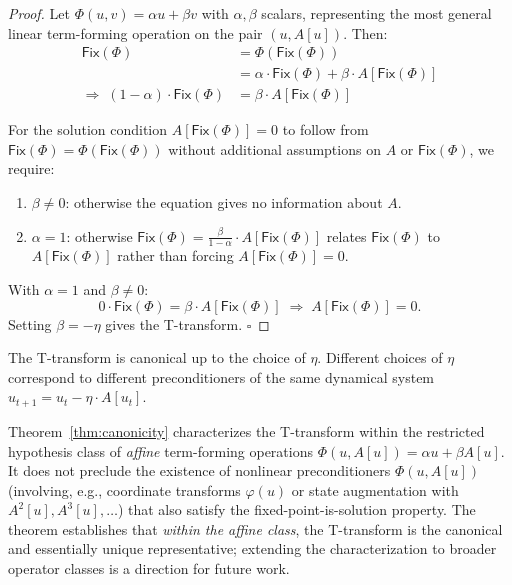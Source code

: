 \documentclass{lmcs}
\theoremstyle{plain}
\theoremstyle{definition}
\newcommand{\fix}{\mathsf{Fix}}
\begin{document}
\begin{proof}
Let $\Phi(u, v) = \alpha u + \beta v$ with $\alpha, \beta$ scalars,
representing the most general linear term-forming operation on the pair
$(u, A[u])$. Then:
\begin{align*}
\fix(\Phi) &= \Phi(\fix(\Phi)) \\
           &= \alpha \cdot \fix(\Phi) + \beta \cdot A[\fix(\Phi)] \\[4pt]
\Rightarrow\; (1 - \alpha) \cdot \fix(\Phi) &= \beta \cdot A[\fix(\Phi)]
\end{align*}

For the solution condition $A[\fix(\Phi)] = 0$ to follow from
$\fix(\Phi) = \Phi(\fix(\Phi))$ without additional assumptions on $A$ or
$\fix(\Phi)$, we require:
\begin{enumerate}
\item $\beta \neq 0$: otherwise the equation gives no information about $A$.
\item $\alpha = 1$: otherwise $\fix(\Phi) = \frac{\beta}{1-\alpha} \cdot
  A[\fix(\Phi)]$ relates $\fix(\Phi)$ to $A[\fix(\Phi)]$ rather than forcing
  $A[\fix(\Phi)] = 0$.
\end{enumerate}
With $\alpha = 1$ and $\beta \neq 0$:
\[
0 \cdot \fix(\Phi) = \beta \cdot A[\fix(\Phi)]
\;\Longrightarrow\; A[\fix(\Phi)] = 0.
\]
Setting $\beta = -\eta$ gives the T-transform. \hfill $\square$
\end{proof}

\begin{cor}
The T-transform is canonical up to the choice of $\eta$. Different choices
of $\eta$ correspond to different preconditioners of the same dynamical
system $u_{t+1} = u_t - \eta \cdot A[u_t]$.
\end{cor}

\begin{rem}\label{rem:canonicity-scope}
Theorem~\ref{thm:canonicity} characterizes the T-transform within the
restricted hypothesis class of \emph{affine} term-forming operations
$\Phi(u, A[u]) = \alpha u + \beta A[u]$. It does not preclude the existence of
nonlinear preconditioners $\Phi(u, A[u])$ (involving, e.g., coordinate
transforms $\varphi(u)$ or state augmentation with $A^2[u], A^3[u], \dots$)
that also satisfy the fixed-point-is-solution property. The theorem establishes
that \emph{within the affine class}, the T-transform is the canonical and
essentially unique representative; extending the characterization to broader
operator classes is a direction for future work.
\end{rem}
\end{document}

